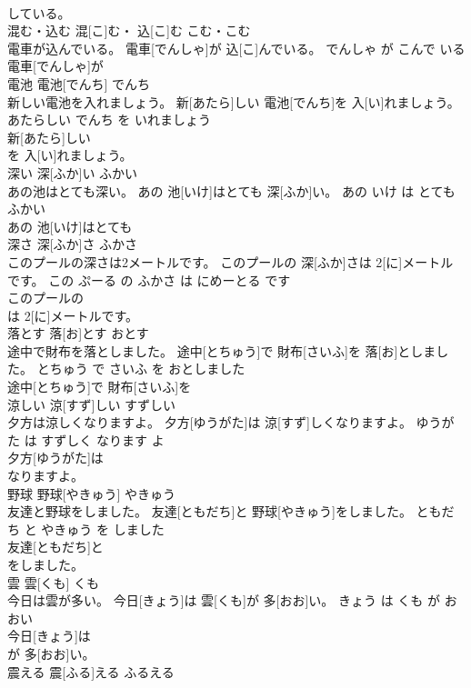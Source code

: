 \documentclass[8pt]{extreport}
\begin{document}
\begin{CJK}{UTF8}{min}
\\	している。			
\\	混む・込む	混[こ]む・ 込[こ]む	こむ・こむ	
\\	電車が込んでいる。	電車[でんしゃ]が 込[こ]んでいる。	でんしゃ が こんで いる	
\\	電車[でんしゃ]が
\\	電池	電池[でんち]	でんち	
\\	新しい電池を入れましょう。	新[あたら]しい 電池[でんち]を 入[い]れましょう。	あたらしい でんち を いれましょう	
\\	新[あたら]しい
\\	を 入[い]れましょう。			
\\	深い	深[ふか]い	ふかい	
\\	あの池はとても深い。	あの 池[いけ]はとても 深[ふか]い。	あの いけ は とても ふかい	
\\	あの 池[いけ]はとても
\\	深さ	深[ふか]さ	ふかさ	
\\	このプールの深さは2メートルです。	このプールの 深[ふか]さは 2[に]メートルです。	この ぷーる の ふかさ は にめーとる です	
\\	このプールの
\\	は 2[に]メートルです。			
\\	落とす	落[お]とす	おとす	
\\	途中で財布を落としました。	途中[とちゅう]で 財布[さいふ]を 落[お]としました。	とちゅう で さいふ を おとしました	
\\	途中[とちゅう]で 財布[さいふ]を
\\	涼しい	涼[すず]しい	すずしい	
\\	夕方は涼しくなりますよ。	夕方[ゆうがた]は 涼[すず]しくなりますよ。	ゆうがた は すずしく なります よ	
\\	夕方[ゆうがた]は
\\	なりますよ。			
\\	野球	野球[やきゅう]	やきゅう	
\\	友達と野球をしました。	友達[ともだち]と 野球[やきゅう]をしました。	ともだち と やきゅう を しました	
\\	友達[ともだち]と
\\	をしました。			
\\	雲	雲[くも]	くも	
\\	今日は雲が多い。	今日[きょう]は 雲[くも]が 多[おお]い。	きょう は くも が おおい	
\\	今日[きょう]は
\\	が 多[おお]い。			
\\	震える	震[ふる]える	ふるえる	

\end{CJK}
\end{document}
